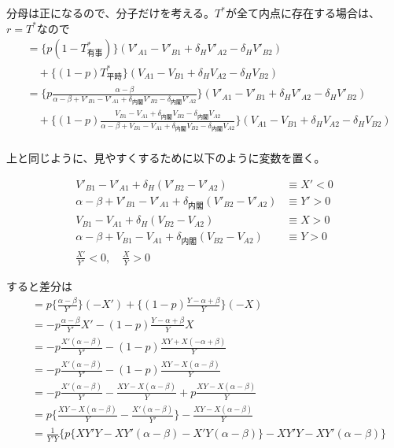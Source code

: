 \documentclass[main.tex]{subfiles}
\begin{document}
分母は正になるので、分子だけを考える。$T^*$が全て内点に存在する場合は、$r=T^*$なので
\begin{align*}
    &= \{p(1-T^*_{有事})\}(V'_{A1} -V'_{B1} + \delta_H V'_{A2} - \delta_H V'_{B2})  \\[1em]
    &\quad + \{ (1-p)T^*_{平時}\}(V_{A1} - V_{B1} + \delta_H V_{A2} - \delta_H V_{B2} ) \\
    &= \{p \frac{ \alpha-\beta }{ \alpha-\beta + V'_{B1}-V'_{A1} + \delta_{内閣}V'_{B2} - \delta_{内閣}V'_{A2} } \} (V'_{A1} -V'_{B1} + \delta_H V'_{A2} - \delta_H V'_{B2})   \\[1em]
    &\quad +    \{ (1-p) \frac{ V_{B1} - V_{A1} +\delta_{内閣}V_{B2} - \delta_{内閣}V_{A2} }{ \alpha-\beta + V_{B1}-V_{A1} + \delta_{内閣}V_{B2} - \delta_{内閣}V_{A2} } \}(V_{A1} - V_{B1} + \delta_H V_{A2} - \delta_H V_{B2} )\\[1em]
\end{align*}

上と同じように、見やすくするために以下のように変数を置く。

\begin{align*}
    V'_{B1} - V'_{A1} + \delta_H (V'_{B2} - V'_{A2}) &\equiv X' < 0\\
    \alpha-\beta + V'_{B1}-V'_{A1} + \delta_{内閣}(V'_{B2} - V'_{A2}) &\equiv Y' > 0\\
    V_{B1} - V_{A1} + \delta_H (V_{B2} - V_{A2}) &\equiv X > 0\\
    \alpha-\beta + V_{B1}-V_{A1} + \delta_{内閣}(V_{B2} - V_{A2}) &\equiv Y > 0\\[1em]
    \frac{X'}{Y'} < 0,\quad \frac{X}{Y} > 0
\end{align*}

すると差分は
\begin{align*}
    &= p\{ \frac{ \alpha - \beta }{ Y' } \}( -X' )  + \{(1-p) \frac{ Y-\alpha + \beta }{ Y } \}(-X )\\[1em]
    &= -p \frac{ \alpha - \beta }{ Y' } X'  -    (1-p) \frac{ Y  -\alpha + \beta }{ Y }X\\[1em]
    &= -p \frac{ X'(\alpha - \beta) }{ Y' }  -    (1-p) \frac{ XY + X(-\alpha + \beta) }{ Y }\\[1em]
    &= -p \frac{ X'(\alpha - \beta) }{ Y' }  -    (1-p) \frac{ XY - X(\alpha - \beta) }{ Y }\\[1em]
    &= -p \frac{ X'(\alpha - \beta) }{ Y' }  -    \frac{ XY - X(\alpha - \beta) }{ Y } + p\frac{ XY - X(\alpha - \beta) }{ Y } \\[1em]
    &= p \Big\{  \frac{ XY - X(\alpha - \beta) }{ Y } - \frac{ X'(\alpha - \beta) }{ Y' } \Big\}  -    \frac{ XY - X(\alpha - \beta) }{ Y }  \\[1em]
    &= \frac{1}{Y'Y} \Big\{ p \{   XY'Y - XY'(\alpha - \beta)  - X'Y(\alpha - \beta)  \}  -     XY'Y - XY'(\alpha - \beta) \Big\} \\
\end{align*}
\end{document}
